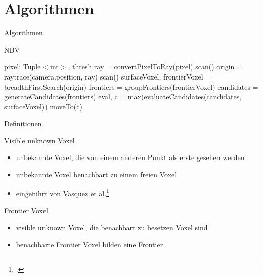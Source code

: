 \documentclass{beamer}
\begin{document}
\section{Algorithmen}
\begin{frame}{Algorithmen}
	\begin{algorithm}[H]
		\caption{NBV}
		\begin{algorithmic}[1]
			\Require pixel: Tuple$<$int$ >$, thresh
			\State ray = convertPixelToRay(pixel)
			\State scan()
			\State origin = raytrace(camera.position, ray)
			\State scan()
			\State surfaceVoxel, frontierVoxel =  breadthFirstSearch(origin)
			\State frontiers = groupFrontiers(frontierVoxel)
			\State candidates = generateCandidates(frontiers)
			\State eval, c = max(evaluateCandidates(candidates, surfaceVoxel))
			\State moveTo(c)
			\EndWhile
		\end{algorithmic}
	\end{algorithm}
\end{frame}
\begin{frame}{Definitionen}
	\begin{exampleblock}{Visible unknown Voxel}
		\begin{itemize}
			\item unbekannte Voxel, die von einem anderen Punkt als erste gesehen werden
			\item unbekannte Voxel benachbart zu einem freien Voxel
			\item eingeführt von Vasquez et al.\footcite{vasquez-gomez_vpl_2020}
		\end{itemize}
	\end{exampleblock}
	\begin{exampleblock}{Frontier Voxel}
		\begin{itemize}
			\item visible unknown Voxel, die benachbart zu besetzen Voxel sind
			\item benachbarte Frontier Voxel bilden eine Frontier

		\end{itemize}
	\end{exampleblock}
\end{frame}
\end{document}
